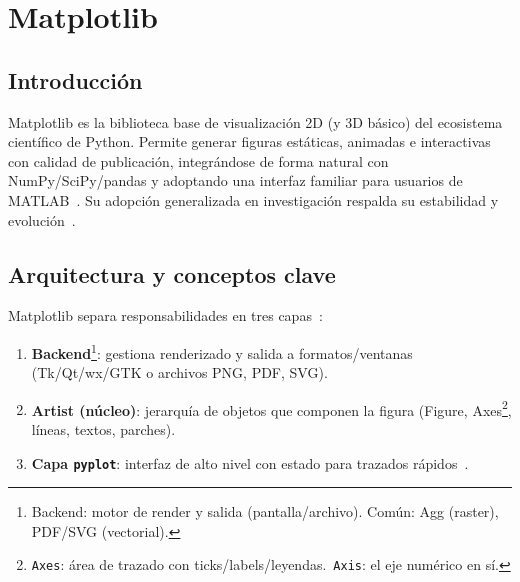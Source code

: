 \section{Matplotlib}

\subsection{Introducción}%
\label{subsec:introduccion}
Matplotlib es la biblioteca base de visualización 2D (y 3D básico) del ecosistema científico de Python. Permite generar figuras estáticas, animadas e interactivas con calidad de publicación, integrándose de forma natural con NumPy/SciPy/pandas y adoptando una interfaz familiar para usuarios de MATLAB~\cite{Hunter2007, VanderPlas2016, MatplotlibDevTeamMain, ActiveStateMatplotlib}. Su adopción generalizada en investigación respalda su estabilidad y evolución~\cite{MatplotlibDevTeamMain}.

\subsection{Arquitectura y conceptos clave}%
\label{subsec:arquitectura}
Matplotlib separa responsabilidades en tres capas~\cite{Jones2012Matplotlib, delftswaMatplotlib}:
\begin{enumerate}
  \item \textbf{Backend}\footnote{Backend: motor de render y salida (pantalla/archivo). Común: Agg (raster), PDF/SVG (vectorial).}: gestiona renderizado y salida a formatos/ventanas (Tk/Qt/wx/GTK o archivos PNG, PDF, SVG).
  \item \textbf{Artist (núcleo)}: jerarquía de objetos que componen la figura (Figure, Axes\footnote{\texttt{Axes}: área de trazado con ticks/labels/leyendas.\ \texttt{Axis}: el eje numérico en sí.}, líneas, textos, parches).
  \item \textbf{Capa \texttt{pyplot}}: interfaz de alto nivel con estado para trazados rápidos~\cite{MatplotlibDevTeamPyplotTut}.
\end{enumerate}

